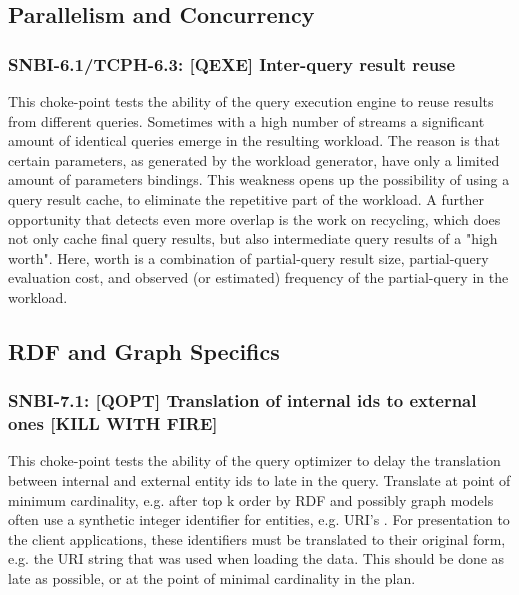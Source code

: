 \subsection{Parallelism and Concurrency}

\subsubsection{SNBI-6.1/TCPH-6.3: [QEXE] Inter-query result reuse}
\label{choke_point_6.1}
This choke-point tests the ability of the query execution engine to reuse results from different queries. Sometimes with a high number of streams a significant amount of identical queries emerge in the resulting workload.
The reason is that certain parameters, as generated by the workload generator, have only a limited amount of parameters bindings.
This weakness opens up the possibility of using a query result cache, to eliminate the repetitive part of the workload.
A further opportunity that detects even more overlap is the work on recycling, which does not only cache final query results, but also intermediate query results of a "high worth".
Here, worth is a combination of partial-query result size, partial-query evaluation cost, and observed (or estimated) frequency of the partial-query in the workload.

\subsection{RDF and Graph Specifics}

\subsubsection{SNBI-7.1: [QOPT]  Translation of internal ids to external ones [KILL WITH FIRE]}
\label{choke_point_7.1}
This choke-point tests the ability of the query optimizer to delay the translation between internal and external entity ids to late in the query. Translate at point of minimum cardinality,
e.g. after top k order by RDF and possibly graph models often use a synthetic integer identifier for entities, e.g. URI's . For presentation to the client applications, these identifiers must be translated to their original form,
e.g. the URI string that was used when loading the data. This should be done as late as possible, or at the point of minimal cardinality in the plan.

